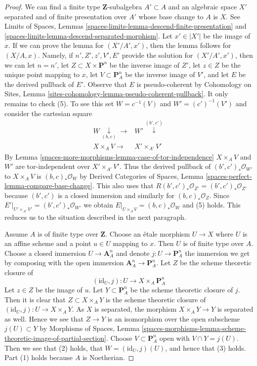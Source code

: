 \begin{proof}
We can find a finite type $\mathbf{Z}$-subalgebra $A' \subset A$
and an algebraic space $X'$ separated and of finite presentation over $A'$
whose base change to $A$ is $X$. See
Limits of Spaces, Lemmas
\ref{spaces-limits-lemma-descend-finite-presentation} and
\ref{spaces-limits-lemma-descend-separated-morphism}.
Let $x' \in |X'|$ be the image of $x$.
If we can prove the lemma for $(X'/A', x')$, then
the lemma follows for $(X/A, x)$.
Namely, if $n', Z', z', V', E'$ provide the solution
for $(X'/A', x')$, then we can let
$n = n'$,
let $Z \subset X \times \mathbf{P}^n$ be the inverse image of $Z'$,
let $z \in Z$ be the unique point mapping to $x$,
let $V \subset \mathbf{P}^n_A$ be the inverse image of $V'$, and
let $E$ be the derived pullback of $E'$.
Observe that $E$ is pseudo-coherent by
Cohomology on Sites, Lemma
\ref{sites-cohomology-lemma-pseudo-coherent-pullback}.
It only remains to check (5). To see this
set $W = c^{-1}(V)$ and $W' = (c')^{-1}(V')$
and consider the cartesian square
$$
\begin{array}{cc}W \underset{(b, c)}{\downarrow}\longrightarrow & W' \overset{(b', c')}{\downarrow} \\ X \times_A V \longrightarrow & X' \times_{A'} V'\end{array}
$$
By Lemma \ref{spaces-more-morphisms-lemma-case-of-tor-independence} $X \times_A V$ and $W'$
are tor-independent over $X' \times_{A'} V'$.
Thus the derived pullback of
$(b', c')_*\mathcal{O}_{W'}$ to $X \times_A V$
is $(b, c)_*\mathcal{O}_W$ by
Derived Categories of Spaces,
Lemma \ref{spaces-perfect-lemma-compare-base-change}.
This also uses that $R(b', c')_*\mathcal{O}_{Z'} = (b', c')_*\mathcal{O}_{Z'}$
because $(b', c')$ is a closed immersion and similarly for
$(b, c)_*\mathcal{O}_Z$.
Since $E'|_{U' \times_{A'} V'} =
(b', c')_*\mathcal{O}_{W'}$ we obtain
$E|_{U \times_A V} = (b, c)_*\mathcal{O}_W$
and (5) holds.
This reduces us to the situation described in the next
paragraph.

\medskip\noindent
Assume $A$ is of finite type over $\mathbf{Z}$.
Choose an \'etale morphism $U \to X$ where $U$ is an affine scheme
and a point $u \in U$ mapping to $x$. Then $U$ is of finite type over $A$.
Choose a closed immersion $U \to \mathbf{A}^n_A$ and denote
$j : U \to \mathbf{P}^n_A$ the immersion we get by composing
with the open immersion $\mathbf{A}^n_A \to \mathbf{P}^n_A$.
Let $Z$ be the scheme theoretic closure of
$$
(\text{id}_U, j) : U \longrightarrow X \times_A \mathbf{P}^n_A
$$
Let $z \in Z$ be the image of $u$.
Let $Y \subset \mathbf{P}^n_A$ be the scheme theoretic
closure of $j$. Then it is clear that $Z \subset X \times_A Y$
is the scheme theoretic closure of
$(\text{id}_U, j) : U \to X \times_A Y$.
As $X$ is separated, the morphism
$X \times_A Y \to Y$ is separated as well.
Hence we see that $Z \to Y$ is an isomorphism over
the open subscheme $j(U) \subset Y$ by
Morphisms of Spaces, Lemma
\ref{spaces-morphisms-lemma-scheme-theoretic-image-of-partial-section}.
Choose $V \subset \mathbf{P}^n_A$ open with $V \cap Y = j(U)$.
Then we see that (2) holds, that $W = (\text{id}_U, j)(U)$, and hence
that (3) holds. Part (1) holds because $A$ is Noetherian.


\end{proof}
